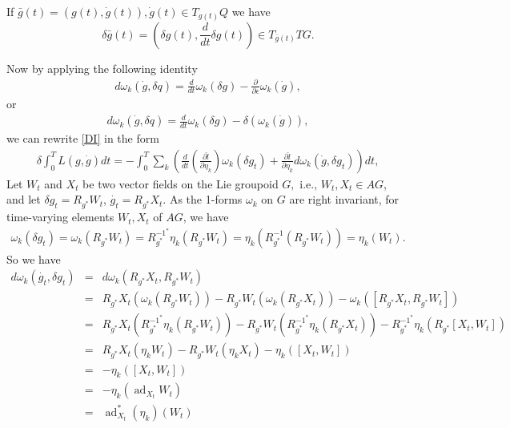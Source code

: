 \documentclass{article}
\begin{document}
If $\bar{g}(t)=(g(t), \dot{g}(t)), \dot{g}(t)\in T_{g(t)} Q$ we have 
$$\delta\bar{g}(t)=(\delta g(t), \frac{d}{dt}\delta g(t))\in T_{\bar g(t)} TG.$$

Now by applying the following identity 
\begin{eqnarray}
d\omega_k (\dot{g}, \delta{q})=\frac{d}{d t}\omega_k(\delta{g})-\frac{\partial}{\partial \epsilon}\omega_k(\dot{g}),\nonumber
\end{eqnarray}
or \begin{eqnarray}\label{Delta L}
d\omega_k (\dot{g}, \delta{q})=\frac{d}{dt}\omega_k(\delta{g})-\delta(\omega_k(\dot{g})),
\end{eqnarray}
we can rewrite \ref{DI} in the form
\begin{eqnarray}\label{DI2}
\delta \int^T_0L(g, \dot{g})dt=-\int^T_0 \sum_k\left(\frac{d}{dt}\left(\frac{\partial\hat{l}}{\partial{\eta_k}}\right)\omega_k(\delta{g_t})+ \frac{\partial\hat{l}}{\partial{\eta_k}}d\omega_k(\dot{g}, \delta g_t)\right)dt,
\end{eqnarray}
Let $W_t$ and $X_t$ be two vector fields on the Lie groupoid $G,$ i.e., $W_t, X_t \in AG,$ and let $\delta g_t=R_{g^*}W_t$, $\dot{g_t}=R_{g^*}X_t.$ As the 1-forms $\omega_k$ on $G$ are right invariant, for time-varying elements $W_t, X_t$ of $AG$, we have 
\begin{eqnarray}\label{OE}
\omega_k (\delta g_t)= \omega_k (R_{g^*}W_t)=R^{-1^*}_{g^*}\eta_k (R_{g^*}W_t)=\eta_k (R^{-1}_{g^*}(R_{g^*}W_t))=\eta_k(W_t).
\end{eqnarray}
So we have
\begin{eqnarray}\label{ad}
d\omega_k(\dot{g_t}, \delta g_t)&=&d\omega_k(R_{g^*}X_t, R_{g^*}W_t)\\ \nonumber
  &=&  R_{g^*}X_t(\omega_k( R_{g^*}W_t))-R_{g^*}W_t( \omega_k( R_{g^*}X_t)) -\omega_k([R_{g^*}X_t, R_{g^*}W_t])\\ \nonumber
  &=& R_{g^*}X_t(R^{-1^*}_{g^*}\eta_k ( R_{g^*}W_t))-R_{g^*}W_t( R^{-1^*}_{g^*}\eta_k( R_{g^*}X_t)) -R^{-1^*}_{g^*}\eta_k(R_{g^*}[X_t, W_t])\\ \nonumber 
  &=&R_{g^*}X_t(\eta_k W_t)-R_{g^*}W_t(\eta_k X_t) -\eta_k([X_t, W_t])\\ \nonumber
  &=& -\eta_k([X_t, W_t])\\ \nonumber
  &=& -\eta_k(\operatorname{ad}_{X_t}W_t)\\ \nonumber
  &=& \operatorname{ad}^*_{X_t}(\eta_k)(W_t)                                  
\end{eqnarray}
\end{document}
